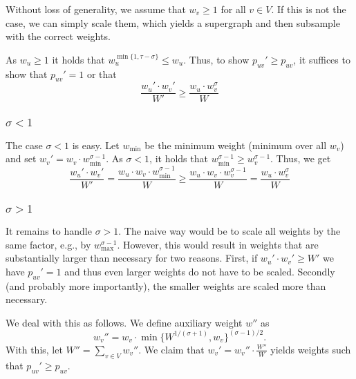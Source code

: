 \documentclass[a4paper,11pt]{article}
\begin{document}
Without loss of generality, we assume that $w_v \ge 1$ for all
$v \in V$.  If this is not the case, we can simply scale them, which
yields a supergraph and then subsample with the correct weights.

As $w_u \ge 1$ it holds that $w_u^{\min\{1, \tau - \sigma\}} \le w_u$.
Thus, to show $p_{uv}' \ge p_{uv}$, it suffices to show that
$p_{uv}' = 1$ or that
%
\begin{equation}
  \label{eq:desired-inequality}
  \frac{w_u' \cdot w_v'}{W'} \ge \frac{w_u \cdot w_v^\sigma}{W}
\end{equation}

\subsubsection{$\sigma < 1$}

The case $\sigma < 1$ is easy.  Let $w_{\min}$ be the minimum weight
(minimum over all $w_v$) and set
$w_v' = w_v \cdot w_{\min}^{\sigma - 1}$.  As $\sigma < 1$, it holds
that $w_{\min}^{\sigma - 1} \ge w_v^{\sigma - 1}$.  Thus, we get
%
\begin{equation*}
  \frac{w_u' \cdot w_v'}{W'} = 
  \frac{w_u \cdot w_v \cdot w_{\min}^{\sigma - 1}}{W} \ge 
  \frac{w_u \cdot w_v \cdot w_{v}^{\sigma - 1}}{W} =
  \frac{w_u \cdot w_v^\sigma}{W}
\end{equation*}

\subsubsection{$\sigma > 1$}

It remains to handle $\sigma > 1$.  The naive way would be to scale
all weights by the same factor, e.g., by $w_{\max}^{\sigma - 1}$.
However, this would result in weights that are substantially larger
than necessary for two reasons.  First, if $w_u' \cdot w_v' \ge W'$ we
have $p_{uv}' = 1$ and thus even larger weights do not have to be
scaled.  Secondly (and probably more importantly), the smaller weights
are scaled more than necessary.

We deal with this as follows.  We define auxiliary weight $w''$
as
%
\begin{equation*}
  w_v'' = w_v \cdot \min\{W^{1 / (\sigma + 1)}, w_v\}^{(\sigma - 1) / 2}.
\end{equation*}
%
With this, let $W'' = \sum_{v \in V} w_v''$.  We claim that
$w_v' = w_v'' \cdot \frac{W''}{W}$ yields weights such that
$p_{uv}' \ge p_{uv}$.
\end{document}
